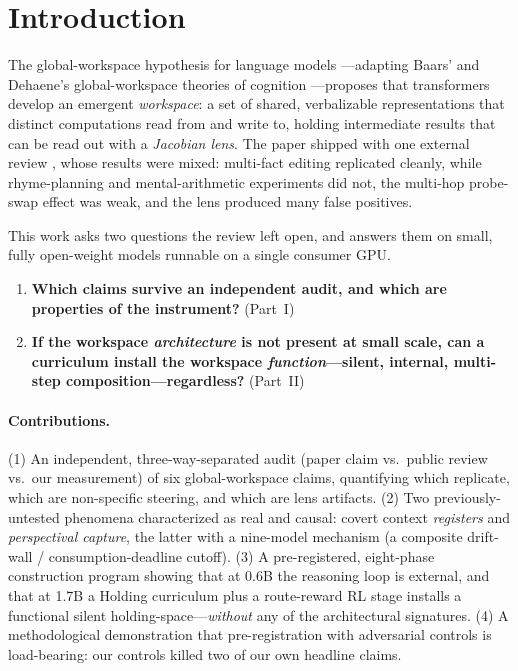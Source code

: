 \documentclass[11pt]{article}
\begin{document}
\section{Introduction}

The global-workspace hypothesis for language models
\cite{anthropic-workspace}---adapting Baars' and Dehaene's global-workspace
theories of cognition \cite{baars,dehaene}---proposes that transformers develop
an emergent \emph{workspace}: a set of shared, verbalizable representations that
distinct computations read from and write to, holding intermediate results that
can be read out with a \emph{Jacobian lens}. The paper shipped with one external
review \cite{nanda-review}, whose results were mixed: multi-fact editing
replicated cleanly, while rhyme-planning and mental-arithmetic experiments did
not, the multi-hop probe-swap effect was weak, and the lens produced many false
positives.

This work asks two questions the review left open, and answers them on small,
fully open-weight models runnable on a single consumer GPU.

\begin{enumerate}[leftmargin=1.4em,itemsep=2pt]
\item \textbf{Which claims survive an independent audit, and which are properties
of the instrument?} (Part~I)
\item \textbf{If the workspace \emph{architecture} is not present at small scale,
can a curriculum install the workspace \emph{function}---silent, internal,
multi-step composition---regardless?} (Part~II)
\end{enumerate}

\paragraph{Contributions.}
(1) An independent, three-way-separated audit (paper claim vs.\ public review vs.\
our measurement) of six global-workspace claims, quantifying which replicate,
which are non-specific steering, and which are lens artifacts.
(2) Two previously-untested phenomena characterized as real and causal: covert
context \emph{registers} and \emph{perspectival capture}, the latter with a
nine-model mechanism (a composite drift-wall / consumption-deadline cutoff).
(3) A pre-registered, eight-phase construction program showing that at 0.6B the
reasoning loop is external, and that at 1.7B a Holding curriculum plus a
route-reward RL stage installs a functional silent holding-space---\emph{without}
any of the architectural signatures.
(4) A methodological demonstration that pre-registration with adversarial
controls is load-bearing: our controls killed two of our own headline claims.
\end{document}
